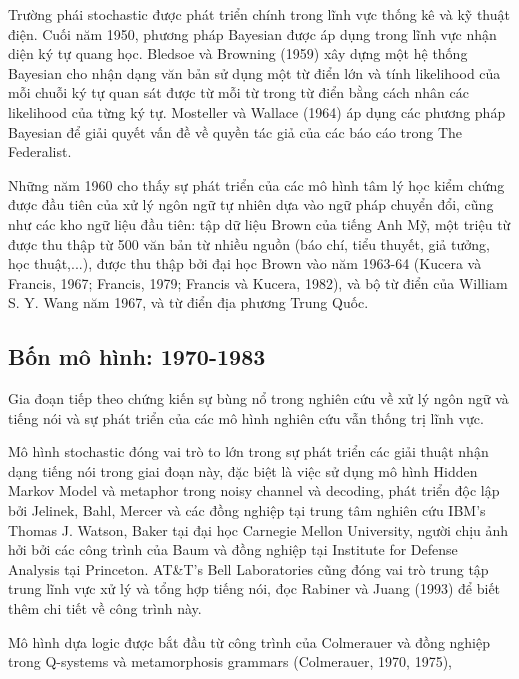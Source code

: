 Trường phái stochastic được phát triển chính trong lĩnh vực thống kê và kỹ thuật điện. Cuối năm 1950, phương pháp Bayesian được áp dụng trong lĩnh vực nhận diện ký tự quang học. Bledsoe và Browning (1959) xây dựng một hệ thống Bayesian cho nhận dạng văn bản sử dụng một từ điển lớn và tính likelihood của mỗi chuỗi ký tự quan sát được từ mỗi từ trong từ điển bằng cách nhân các likelihood của từng ký tự. Mosteller và Wallace (1964) áp dụng các phương pháp Bayesian để giải quyết vấn đề về quyền tác giả của các báo cáo trong The Federalist.

Những năm 1960 cho thấy sự phát triển của các mô hình tâm lý học kiểm chứng được đầu tiên của xử lý ngôn ngữ tự nhiên dựa vào ngữ pháp chuyển đổi, cũng như các kho ngữ liệu đầu tiên: tập dữ liệu Brown của tiếng Anh Mỹ, một triệu từ được thu thập từ 500 văn bản từ nhiều nguồn (báo chí, tiểu thuyết, giả tưởng, học thuật,...), được thu thập bởi đại học Brown vào năm 1963-64 (Kucera và Francis, 1967; Francis, 1979; Francis và Kucera, 1982), và bộ từ điển của William S. Y. Wang năm 1967, và từ điển địa phương Trung Quốc.

\subsection{Bốn mô hình: 1970-1983}

Gia đoạn tiếp theo chứng kiến sự bùng nổ trong nghiên cứu về xử lý ngôn ngữ và tiếng nói và sự phát triển của các mô hình nghiên cứu vẫn thống trị lĩnh vực.

Mô hình stochastic đóng vai trò to lớn trong sự phát triển các giải thuật nhận dạng tiếng nói trong giai đoạn này, đặc biệt là việc sử dụng mô hình Hidden Markov Model và metaphor trong noisy channel và decoding, phát triển độc lập bởi Jelinek, Bahl, Mercer và các đồng nghiệp tại trung tâm nghiên cứu IBM's Thomas J. Watson, Baker tại đại học Carnegie Mellon University, người chịu ảnh hởi bởi các công trình của Baum và đồng nghiệp tại Institute for Defense Analysis tại Princeton. AT&T's Bell Laboratories cũng đóng vai trò trung tập trung lĩnh vực xử lý và tổng hợp tiếng nói, đọc Rabiner và Juang (1993) để biết thêm chi tiết về công trình này.

Mô hình dựa logic được bắt đầu từ công trình của Colmerauer và đồng nghiệp trong Q-systems và metamorphosis grammars (Colmerauer, 1970, 1975),
